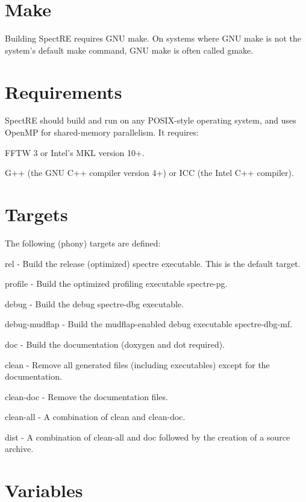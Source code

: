 \hypertarget{building_make}{}\section{Make}\label{building_make}
Building SpectRE requires GNU make. On systems where GNU make is not the system's default make command, GNU make is often called gmake.\hypertarget{building_reqs}{}\section{Requirements}\label{building_reqs}
SpectRE should build and run on any POSIX-\/style operating system, and uses OpenMP for shared-\/memory parallelism. It requires: \begin{DoxyItemize}
\item FFTW 3 or Intel's MKL version 10+. \item G++ (the GNU C++ compiler version 4+) or ICC (the Intel C++ compiler).\end{DoxyItemize}
\hypertarget{building_targets}{}\section{Targets}\label{building_targets}
The following (phony) targets are defined: \begin{DoxyItemize}
\item rel -\/ Build the release (optimized) spectre executable. This is the default target. \item profile -\/ Build the optimized profiling executable spectre-\/pg. \item debug -\/ Build the debug spectre-\/dbg executable. \item debug-\/mudflap -\/ Build the mudflap-\/enabled debug executable spectre-\/dbg-\/mf. \item doc -\/ Build the documentation (doxygen and dot required). \item clean -\/ Remove all generated files (including executables) except for the documentation. \item clean-\/doc -\/ Remove the documentation files. \item clean-\/all -\/ A combination of clean and clean-\/doc. \item dist -\/ A combination of clean-\/all and doc followed by the creation of a source archive.\end{DoxyItemize}
\hypertarget{building_vars}{}\section{Variables}\label{building_vars}
